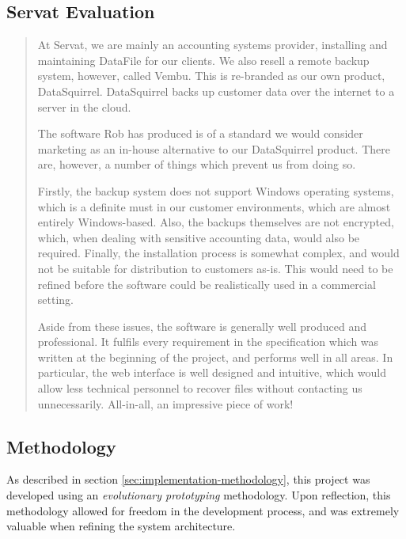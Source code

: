 \subsection{Servat Evaluation}

\begin{quote}
\begin{em}

    At Servat, we are mainly an accounting systems provider, installing and
    maintaining DataFile for our clients. We also resell a remote backup
    system, however, called Vembu. This is re-branded as our own product,
    DataSquirrel. DataSquirrel backs up customer data over the internet to
    a server in the cloud.

    The software Rob has produced is of a standard we would consider marketing
    as an in-house alternative to our DataSquirrel product. There are, however,
    a number of things which prevent us from doing so.
    
    Firstly, the backup system does not support Windows operating systems,
    which is a definite must in our customer environments, which are almost
    entirely Windows-based. Also, the backups themselves are not encrypted,
    which, when dealing with sensitive accounting data, would also be required.
    Finally, the installation process is somewhat complex, and would not be
    suitable for distribution to customers as-is. This would need to be refined
    before the software could be realistically used in a commercial setting.

    Aside from these issues, the software is generally well produced and
    professional. It fulfils every requirement in the specification which was
    written at the beginning of the project, and performs well in all areas. In
    particular, the web interface is well designed and intuitive, which would
    allow less technical personnel to recover files without contacting us
    unnecessarily. All-in-all, an impressive piece of work!

\end{em}
\end{quote}

\subsection{Methodology}

As described in section \ref{sec:implementation-methodology}, this project was
developed using an \emph{evolutionary prototyping} methodology. Upon
reflection, this methodology allowed for freedom in the development process,
and was extremely valuable when refining the system architecture.

